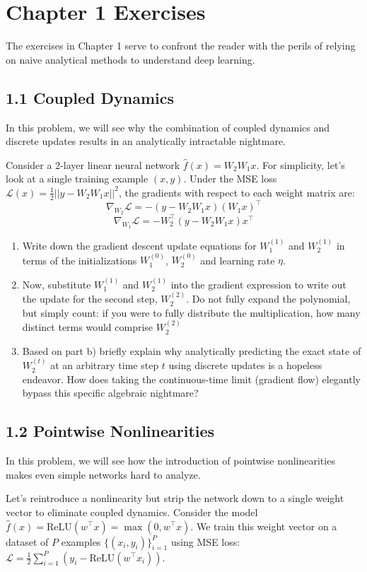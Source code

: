 \section*{Chapter 1 Exercises}
The exercises in Chapter 1 serve to confront the reader with the perils of relying on naive analytical methods to understand deep learning.

\subsection*{1.1 Coupled Dynamics}
In this problem, we will see why the combination of coupled dynamics and discrete updates results in an analytically intractable nightmare.

Consider a 2-layer linear neural network $\hat{f}(x) = W_2 W_1 x$. For simplicity, let's look at a single training example $(x, y)$. Under the MSE loss $\mathcal{L}(x) = \frac{1}{2} ||y - W_2 W_1 x||^2$, the gradients with respect to each weight matrix are:
$$
\nabla_{W_2} \mathcal{L} = -(y - W_2 W_1 x)(W_1 x)^\top$$$$\nabla_{W_1} \mathcal{L} = -W_2^\top (y - W_2 W_1 x)x^\top
$$

\begin{enumerate}[label=\alph*)]
    \item Write down the gradient descent update equations for $W_1^{(1)}$ and $W_2^{(1)}$ in terms of the initializations $W_1^{(0)}$, $W_2^{(0)}$ and learning rate $\eta$.
    \item Now, substitute $W_1^{(1)}$ and $W_2^{(1)}$ into the gradient expression to write out the update for the second step, $W_2^{(2)}$. Do not fully expand the polynomial, but simply count: if you were to fully distribute the multiplication, how many distinct terms would comprise $W_2^{(2)}$
    \item Based on part b) briefly explain why analytically predicting the exact state of $W_2^{(t)}$ at an arbitrary time step $t$ using discrete updates is a hopeless endeavor. How does taking the continuous-time limit (gradient flow) elegantly bypass this specific algebraic nightmare?
\end{enumerate}

\subsection*{1.2 Pointwise Nonlinearities}
In this problem, we will see how the introduction of pointwise nonlinearities makes even simple networks hard to analyze.

Let's reintroduce a nonlinearity but strip the network down to a single weight vector to eliminate coupled dynamics. Consider the model $\hat{f}(x) = \text{ReLU}(w^\top x) = \max(0, w^\top x)$. We train this weight vector on a dataset of $P$ examples $\{ (x_i, y_i) \}_{i=1}^P$ using MSE loss: $\mathcal{L}=\frac{1}{2}\sum^P_{i=1}(y_i-\mathrm{ReLU}(w^\top x_i))$.

